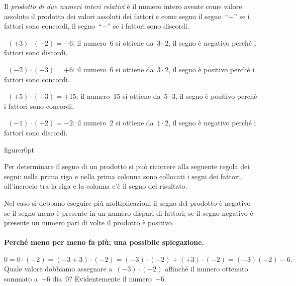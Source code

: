 Il \emph{prodotto di due numeri interi relativi} è il numero intero avente 
come 
valore assoluto il prodotto
dei valori assoluti dei fattori e come segno il segno~``\(+\)'' se i 
fattori sono 
concordi,
il segno~``\(-\)'' se i fattori sono discordi.

 \begin{esempio}
~\((+3)\cdot(-2)=-6\): il numero~6 si ottiene da~\(3\cdot2\), il segno è 
negativo 
perché i fattori sono discordi.
 \end{esempio}

 \begin{esempio}
~\((-2)\cdot(-3)=+6\): il numero~6 si ottiene da~\(3\cdot2\), il segno è 
positivo 
perché i fattori sono concordi.
 \end{esempio}
 \begin{esempio}
~\((+5)\cdot(+3)=+15\): il numero~15 si ottiene da~\(5\cdot3\), il segno è 
positivo 
perché i fattori sono concordi.
 \end{esempio}
 \begin{esempio}
~\((-1)\cdot(+2)=-2\): il numero~2 si ottiene da~\(1\cdot2\), il segno è 
negativo 
perché i fattori sono discordi.
 \end{esempio}


\begin{wrapfloat}{figure}{r}{0pt}

\end{wrapfloat}
Per determinare il segno di un prodotto si può ricorrere alla seguente 
regola 
dei segni: nella prima riga e
nella prima colonna sono collocati i segni dei fattori, all'incrocio tra la 
riga 
e la colonna c'è il segno
del risultato.

Nel caso si debbano eseguire più moltiplicazioni il segno del prodotto è 
negativo se il segno meno è presente
in un numero dispari di fattori; se il segno negativo è presente un numero 
pari 
di volte il prodotto è positivo.

\paragraph{Perché meno per meno fa più; una possibile spiegazione.}
\[0=0\cdot (-2) = (-3+3)\cdot (-2) = 
(-3)\cdot(-2)+(+3)\cdot(-2)=(-3)(-2)-6.\]
Quale valore dobbiamo assegnare a~\((-3)\cdot(-2)\) affinché il numero 
ottenuto 
sommato a~\(-6\) dia~0?
Evidentemente il numero~\(+6\).

